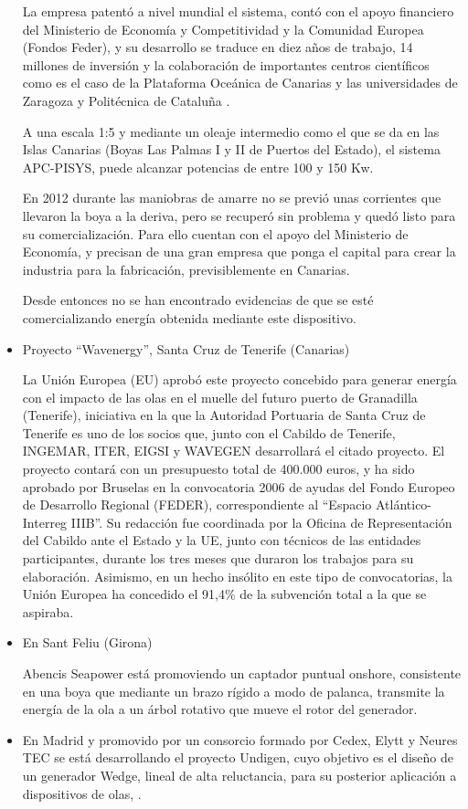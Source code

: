 \begin{itemize}
  La empresa patentó a nivel mundial el sistema, contó con el apoyo
  financiero del Ministerio de Economía y Competitividad y la Comunidad
  Europea (Fondos Feder), y su desarrollo se traduce en diez años de
  trabajo, 14 millones de inversión y la colaboración de importantes
  centros científicos como es el caso de la Plataforma Oceánica de
  Canarias y las universidades de Zaragoza y Politécnica de Cataluña \cite{hernandez12}.

  A una escala 1:5 y mediante un oleaje intermedio como el que se da en
  las Islas Canarias (Boyas Las Palmas I y II de Puertos del Estado), el
  sistema APC-PISYS, puede alcanzar potencias de entre 100 y 150 Kw.

  En 2012 durante las maniobras de amarre no se previó unas corrientes
  que llevaron la boya a la deriva, pero se recuperó sin problema y
  quedó listo para su comercialización. Para ello cuentan con el apoyo
  del Ministerio de Economía, y precisan de una gran empresa que ponga
  el capital para crear la industria para la fabricación,
  previsiblemente en Canarias.

  Desde entonces no se han encontrado evidencias de que se esté comercializando
  energía obtenida mediante este dispositivo.
\item
  Proyecto ``Wavenergy'', Santa Cruz de Tenerife (Canarias)

  La Unión Europea (EU) aprobó este proyecto concebido para generar
  energía con el impacto de las olas en el muelle del futuro puerto de
  Granadilla (Tenerife), iniciativa en la que la Autoridad Portuaria de
  Santa Cruz de Tenerife es uno de los socios que, junto con el Cabildo
  de Tenerife, INGEMAR, ITER, EIGSI y WAVEGEN desarrollará el citado
  proyecto. El proyecto contará con un presupuesto total de 400.000
  euros, y ha sido aprobado por Bruselas en la convocatoria 2006 de
  ayudas del Fondo Europeo de Desarrollo Regional (FEDER),
  correspondiente al ``Espacio Atlántico-Interreg IIIB''. Su redacción
  fue coordinada por la Oficina de Representación del Cabildo ante el
  Estado y la UE, junto con técnicos de las entidades participantes,
  durante los tres meses que duraron los trabajos para su elaboración.
  Asimismo, en un hecho insólito en este tipo de convocatorias, la Unión
  Europea ha concedido el 91,4\% de la subvención total a la que se
  aspiraba.
\item
  En Sant Feliu (Girona)

  Abencis Seapower está promoviendo un captador puntual onshore,
  consistente en una boya que mediante un brazo rígido a modo de
  palanca, transmite la energía de la ola a un árbol rotativo que mueve
  el rotor del generador.
\item
  En Madrid y promovido por un consorcio formado por Cedex, Elytt y
  Neures TEC se está desarrollando el proyecto Undigen, cuyo objetivo es
  el diseño de un generador Wedge, lineal de alta reluctancia, para su
  posterior aplicación a dispositivos de olas, \cite{norvento14}.
\end{itemize}
